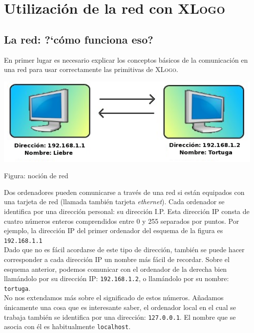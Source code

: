\chapter{Utilizaci\'on de la red con \textsc{XLogo}}
  \label{Red_XLogo}

\section{La red: ?`c\'omo funciona eso?}
  \label{Red_Como}
En primer lugar es necesario explicar los conceptos b\'asicos de la
comunicaci\'on en una red para usar correctamente las primitivas de
\textsc{XLogo}. \\
\begin{center}
\includegraphics[scale=0.5]{Imagenes/12_Redes/Redes_es.png}

Figura: noci\'on de red
\end{center}

Dos ordenadores pueden comunicarse a trav\'es de una red si est\'an equipados
con una tarjeta de red (llamada tambi\'en tarjeta \textit{ethernet}). Cada
ordenador se  identifica por una direcci\'on personal: su direcci\'on I.P.
Esta direcci\'on IP consta de cuatro n\'umeros enteros comprendidos entre
0 y 255 separados por puntos. Por ejemplo, la direcci\'on IP del primer
ordenador del esquema de la figura es \texttt{192.168.1.1} \\

Dado que no es f\'acil acordarse de este tipo de direcci\'on, tambi\'en se
puede hacer corresponder a cada direcci\'on IP un nombre m\'as f\'acil de
recordar. Sobre el esquema anterior, podemos comunicar con el ordenador de
la derecha bien llam\'andolo por su direcci\'on IP: \texttt{192.168.1.2}, o
llam\'andolo por su nombre: \texttt{tortuga}. \\

No nos extendamos m\'as sobre el significado de estos n\'umeros. A\~nadamos
\'unicamente una cosa que es interesante saber, el ordenador local en el cual
se trabaja tambi\'en se identifica por una direcci\'on: \texttt{127.0.0.1}.
El nombre que se asocia con \'el es habitualmente \texttt{localhost}.

